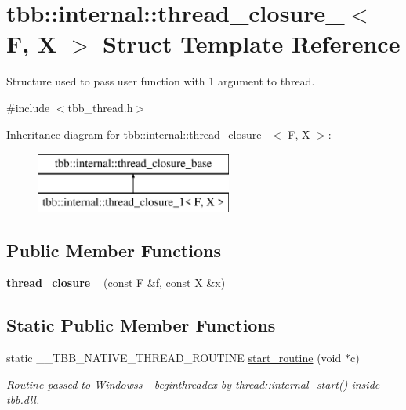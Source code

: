 \hypertarget{structtbb_1_1internal_1_1thread__closure__1}{}\section{tbb\+:\+:internal\+:\+:thread\+\_\+closure\+\_$<$ F, X $>$ Struct Template Reference}
\label{structtbb_1_1internal_1_1thread__closure__1}


Structure used to pass user function with 1 argument to thread.  




{\ttfamily \#include $<$tbb\+\_\+thread.\+h$>$}

Inheritance diagram for tbb\+:\+:internal\+:\+:thread\+\_\+closure\+\_$<$ F, X $>$\+:\begin{figure}[H]
\begin{center}
\leavevmode
\includegraphics[height=2.000000cm]{structtbb_1_1internal_1_1thread__closure__1}
\end{center}
\end{figure}
\subsection*{Public Member Functions}
\begin{DoxyCompactItemize}
\item 
\hypertarget{structtbb_1_1internal_1_1thread__closure__1_afef38584bcf65f3f71700cfec80b8b18}{}{\bfseries thread\+\_\+closure\+\_} (const F \&f, const \hyperlink{structX}{X} \&x)\label{structtbb_1_1internal_1_1thread__closure__1_afef38584bcf65f3f71700cfec80b8b18}

\end{DoxyCompactItemize}
\subsection*{Static Public Member Functions}
\begin{DoxyCompactItemize}
\item 
\hypertarget{structtbb_1_1internal_1_1thread__closure__1_a33d533b3301c45708c6252d040f855a6}{}static \+\_\+\+\_\+\+T\+B\+B\+\_\+\+N\+A\+T\+I\+V\+E\+\_\+\+T\+H\+R\+E\+A\+D\+\_\+\+R\+O\+U\+T\+I\+N\+E \hyperlink{structtbb_1_1internal_1_1thread__closure__1_a33d533b3301c45708c6252d040f855a6}{start\+\_\+routine} (void $\ast$c)\label{structtbb_1_1internal_1_1thread__closure__1_a33d533b3301c45708c6252d040f855a6}

\begin{DoxyCompactList}\small\item\em Routine passed to Windows\textquotesingle{}s \+\_\+beginthreadex by thread\+::internal\+\_\+start() inside tbb.\+dll. \end{DoxyCompactList}\end{DoxyCompactItemize}
